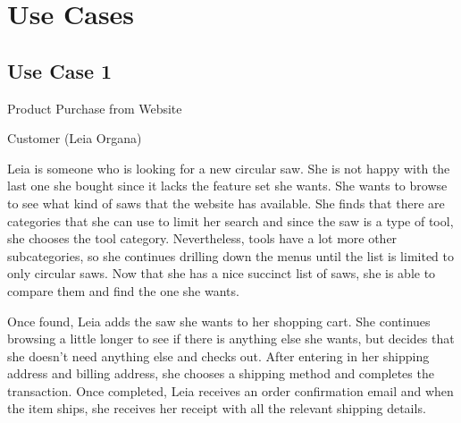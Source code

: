 \pagebreak
\section{Use Cases}
\subsection{Use Case 1}
\begin{description}[font=\bfseries\itshape]
\item[Title:]Product Purchase from Website
\item[Actors:]Customer (Leia Organa)
\item[Description:]Leia is someone who is looking for a new circular saw.  She is not happy with the last one she bought since it lacks the feature set she wants.  She wants to browse to see what kind of saws that the website has available.  She finds that there are categories that she can use to limit her search and since the saw is a type of tool, she chooses the tool category.  Nevertheless, tools have a lot more other subcategories, so she continues drilling down the menus until the list is limited to only circular saws.  Now that she has a nice succinct list of saws, she is able to compare them and find the one she wants.

\hspace*{2em}Once found, Leia adds the saw she wants to her shopping cart.  She continues browsing a little longer to see if there is anything else she wants, but decides that she doesn't need anything else and checks out.  After entering in her shipping address and billing address, she chooses a shipping method and completes the transaction.  Once completed, Leia receives an order confirmation email and when the item ships, she receives her receipt with all the relevant shipping details.
\end{description}

